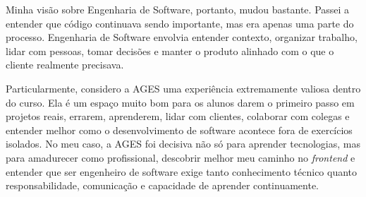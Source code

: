 Minha visão sobre Engenharia de Software, portanto, mudou bastante. Passei a entender que código continuava sendo importante, mas era apenas uma parte do processo. Engenharia de Software envolvia entender contexto, organizar trabalho, lidar com pessoas, tomar decisões e manter o produto alinhado com o que o cliente realmente precisava.

Particularmente, considero a AGES uma experiência extremamente valiosa dentro do curso. Ela é um espaço muito bom para os alunos darem o primeiro passo em projetos reais, errarem, aprenderem, lidar com clientes, colaborar com colegas e entender melhor como o desenvolvimento de software acontece fora de exercícios isolados. No meu caso, a AGES foi decisiva não só para aprender tecnologias, mas para amadurecer como profissional, descobrir melhor meu caminho no \textit{frontend} e entender que ser engenheiro de software exige tanto conhecimento técnico quanto responsabilidade, comunicação e capacidade de aprender continuamente.
